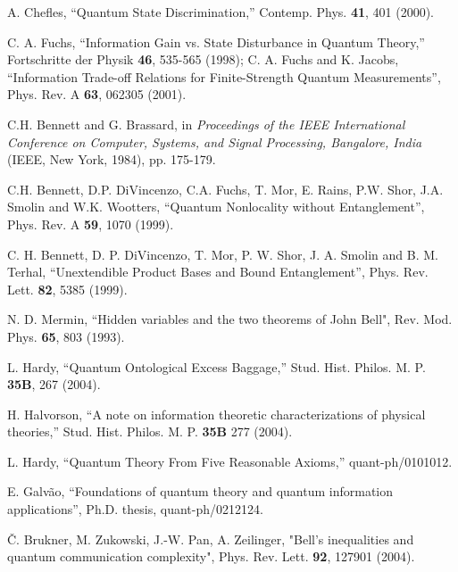 \documentclass[pra,nofootinbib,showpacs,12pt]{revtex4}
\begin{document}
\begin{thebibliography}{99}
 A. Chefles, ``Quantum State Discrimination,''
Contemp. Phys. \textbf{41}, 401 (2000).

 C. A. Fuchs, ``Information Gain vs. State
Disturbance in Quantum Theory,'' Fortschritte der Physik \textbf{46},
535-565 (1998); C. A. Fuchs and K. Jacobs, ``Information Trade-off Relations
for Finite-Strength Quantum Measurements'', Phys. Rev. A \textbf{63}, 062305
(2001).

 C.H. Bennett and G. Brassard, in \textit{Proceedings of the
IEEE International Conference on Computer, Systems, and Signal Processing,
Bangalore, India} (IEEE, New York, 1984), pp. 175-179.

 C.H. Bennett, D.P. DiVincenzo, C.A. Fuchs, T.
Mor, E. Rains, P.W. Shor, J.A. Smolin and W.K. Wootters, ``Quantum
Nonlocality without Entanglement'', Phys. Rev. A \textbf{59}, 1070 (1999).

 C. H. Bennett, D. P. DiVincenzo, T. Mor, P. W. Shor, J. A.
Smolin and B. M. Terhal, ``Unextendible Product Bases and Bound
Entanglement'', Phys. Rev. Lett. \textbf{82}, 5385 (1999).

 N. D. Mermin, ``Hidden variables and the two theorems of
John Bell", Rev. Mod. Phys. \textbf{65}, 803 (1993).

 L. Hardy, ``Quantum Ontological Excess Baggage,''
Stud. Hist. Philos. M. P. \textbf{35B}, 267 (2004).

 H. Halvorson, ``A note on information theoretic
characterizations of physical theories,'' Stud. Hist. Philos. M.
P. \textbf{35B} 277 (2004).

 L. Hardy, ``Quantum Theory From Five Reasonable
Axioms,'' quant-ph/0101012.

 E. Galv\~{a}o, ``Foundations of quantum theory and quantum
information applications'', Ph.D. thesis, quant-ph/0212124.

 \v{C}. Brukner, M. Zukowski, J.-W. Pan, A. Zeilinger,
"Bell's inequalities and quantum communication complexity", Phys.
Rev. Lett. \textbf{92}, 127901 (2004).




\end{thebibliography}
\end{document}
